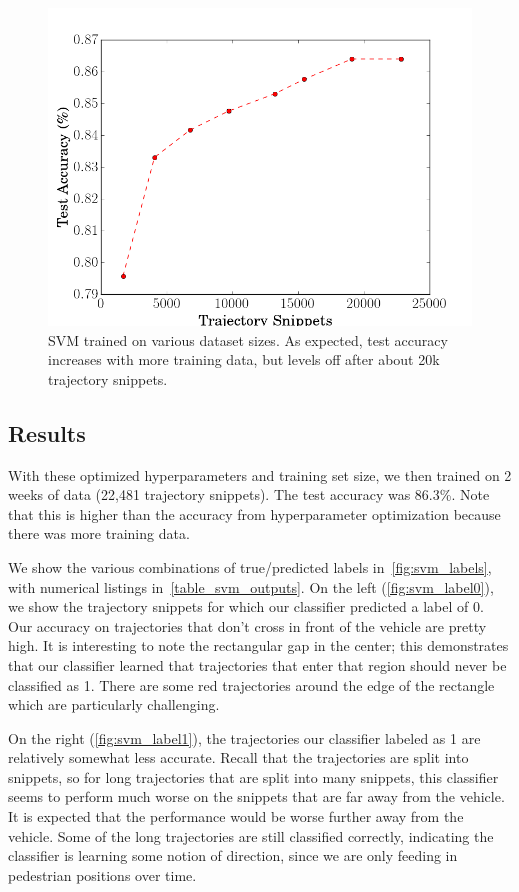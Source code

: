 \begin{figure}
  \centering
  \includegraphics [trim=0 0 0 0, clip, angle=0, width=0.8\columnwidth,
  keepaspectratio]{figures/svm_num_datapts}
  \caption{SVM trained on various dataset sizes. As expected, test accuracy increases with more training data, but levels off after about 20k trajectory snippets.} 
  \label{fig:svm_num_datapts} 
\end{figure}


\subsection{Results}
With these optimized hyperparameters and training set size, we then trained on 2 weeks of data (22,481 trajectory snippets).
The test accuracy was 86.3\%.
Note that this is higher than the accuracy from hyperparameter optimization because there was more training data.

We show the various combinations of true/predicted labels in~\cref{fig:svm_labels}, with numerical listings in~\cref{table_svm_outputs}.
On the left (\cref{fig:svm_label0}), we show the trajectory snippets for which our classifier predicted a label of 0.
Our accuracy on trajectories that don't cross in front of the vehicle are pretty high.
It is interesting to note the rectangular gap in the center; this demonstrates that our classifier learned that trajectories that enter that region should never be classified as 1.
There are some red trajectories around the edge of the rectangle which are particularly challenging. 

On the right (\cref{fig:svm_label1}), the trajectories our classifier labeled as 1 are relatively somewhat less accurate.
Recall that the trajectories are split into snippets, so for long trajectories that are split into many snippets, this classifier seems to perform much worse on the snippets that are far away from the vehicle.
It is expected that the performance would be worse further away from the vehicle.
Some of the long trajectories are still classified correctly, indicating the classifier is learning some notion of direction, since we are only feeding in pedestrian positions over time.


